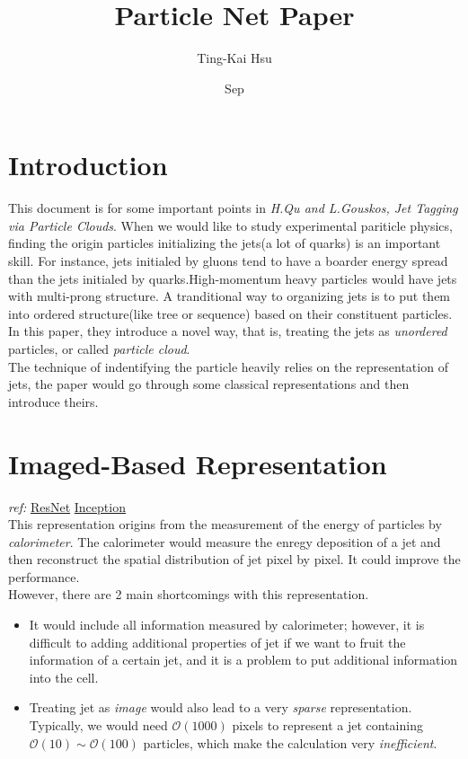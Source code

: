 \documentclass[12pt]{article}
\title{Particle Net Paper}
\author{Ting-Kai Hsu}
\date{Sep}
\numberwithin{equation}{section}
\begin{document}
\maketitle
\tableofcontents

\section{Introduction}
This document is for some important points in \textit{H.Qu and L.Gouskos, Jet Tagging via Particle Clouds}.
When we would like to study experimental pariticle physics, finding the origin particles initializing the jets(a lot of quarks) is an important skill. For instance, jets initialed by gluons tend to have a boarder energy spread than the jets initialed by quarks.High-momentum heavy particles would have jets with multi-prong structure. A tranditional way to organizing jets is to put them into ordered structure(like tree or sequence) based on their constituent particles. In this paper, they introduce a novel way, that is, treating the jets as \textit{unordered} particles, or called \textit{particle cloud}.
\\
\indent The technique of indentifying the particle heavily relies on the representation of jets, the paper would go through some classical representations and then introduce theirs. 

\section{Imaged-Based Representation}
\textit{ref: }\href{https://link.springer.com/article/10.1007/JHEP02(2014)057}{ResNet}   \href{https://ieeexplore.ieee.org/document/7780677}{Inception}
\\
\indent This representation origins from the measurement of the energy of particles by \textit{calorimeter}. The calorimeter would measure the enregy deposition of a jet and then reconstruct the spatial distribution of jet pixel by pixel. It could improve the performance.
\\
\indent However, there are 2 main shortcomings with this representation.

\begin{itemize}
    \item It would include all information measured by calorimeter; however, it is difficult to adding additional properties of jet if we want to fruit the information of a certain jet, and it is a problem to put additional information into the cell.
    \item Treating jet as \textit{image} would also lead to a very \textit{sparse} representation. Typically, we would need $\mathcal{O}(1000)$ pixels to represent a jet containing $\mathcal{O}(10) \sim \mathcal{O}(100)$ particles, which make the calculation very \textit{inefficient}. 
\end{itemize}
\end{document}
